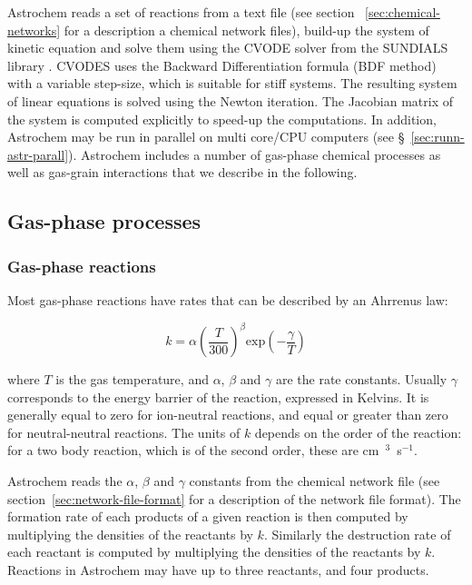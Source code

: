 \documentclass[a4paper,12pt]{article}
\begin{document}
 Astrochem reads a set of reactions from a text file (see section~
 \ref{sec:chemical-networks} for a description a chemical network
 files), build-up the system of kinetic equation and solve them using
 the CVODE solver \citep{Cohen96} from the SUNDIALS library
 \citep{Hindmarsh05}. CVODES uses the Backward Differentiation
 formula (BDF method) with a variable step-size, which is suitable
 for stiff systems. The resulting system of linear equations is solved
 using the Newton iteration. The Jacobian matrix of the system is
 computed explicitly to speed-up the computations. In addition,
 Astrochem may be run in parallel on multi core/CPU computers (see
 \S~\ref{sec:runn-astr-parall}). Astrochem includes a number of
 gas-phase chemical processes as well as gas-grain interactions that
 we describe in the following.

\subsection{Gas-phase processes}
\label{sec:gas-phase-processes}
 
\subsubsection{Gas-phase reactions}
\label{sec:gas-phase-reactions}

Most gas-phase reactions have rates that can be described by an
Ahrrenus law:

\begin{equation}
  k = \alpha  \left( \frac{T}{300} \right)^\beta  \mathrm{exp} \left(
    -\frac{\gamma}{T} \right)
  \label{eq:arrhenius}
\end{equation}

\noindent
where $T$ is the gas temperature, and $\alpha$, $\beta$ and $\gamma$
are the rate constants. Usually $\gamma$ corresponds to the energy
barrier of the reaction, expressed in Kelvins. It is generally equal
to zero for ion-neutral reactions, and equal or greater than zero for
neutral-neutral reactions. The units of $k$ depends on the order of
the reaction: for a two body reaction, which is of the second order,
these are cm~$^{3}$~s$^{-1}$.

Astrochem reads the $\alpha$, $\beta$ and $\gamma$ constants from the
chemical network file (see section~\ref{sec:network-file-format} for a
description of the network file format). The formation rate of each
products of a given reaction is then computed by multiplying the
densities of the reactants by $k$. Similarly the destruction rate of
each reactant is computed by multiplying the densities of the
reactants by $k$. Reactions in Astrochem may have up to three
reactants, and four products.
\end{document}
